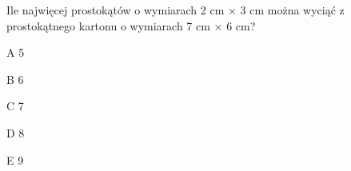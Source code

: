 \begin{tresc}
Ile najwięcej prostokątów o wymiarach 2 cm × 3 cm można wyciąć z prostokątnego kartonu o wymiarach 7 cm × 6 cm?
\end{tresc}
\begin{wariant}{A} 5 \end{wariant}
\begin{wariant}{B} 6 \end{wariant}
\begin{wariant}{C} 7 \end{wariant}
\begin{wariant}{D} 8 \end{wariant}
\begin{wariant}{E} 9 \end{wariant}
